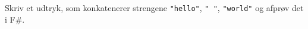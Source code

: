 Skriv et udtryk, som konkatenerer strengene \lstinline{"hello"}, \lstinline{" "}, \lstinline{"world"} og afprøv det i F\#.
